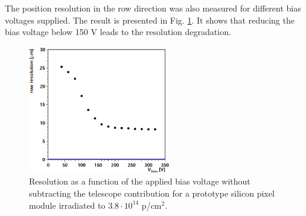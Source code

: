 The position resolution in the row direction was also measured for different bias voltages supplied. The result is presented in Fig. \ref{fig:bias_res}.
It shows that reducing the bias voltage below 150 V leads to the resolution degradation.

\begin{figure}[t]
 \centering
 \includegraphics[width=0.55\textwidth]{021_pixel_upgrade/plots/bias_resol.png}
 \caption{Resolution as a function of the applied bias voltage without subtracting the telescope contribution for a prototype silicon pixel module 
 irradiated to $3.8 \cdot 10^{14}$ p/cm$^2$.}
 \label{fig:bias_res}
\end{figure}
